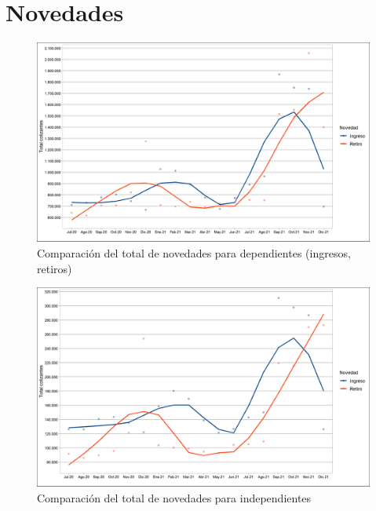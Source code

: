 \section{Novedades}


\begin{figure}
\label{fig:Cap22:Novedad_1}%
\includegraphics[width = 11.5cm]{figures/Capitulo_2_2/total_novedades_dependientes_1.png}
\caption{Comparación del total de novedades para dependientes (ingresos, retiros)}
\label{figura:novedad:sectorprivado:IR}
\end{figure}

\lipsum[2-4]

\begin{figure}
\label{fig:Cap22:Novedad_2}
\includegraphics[width = 11.5cm]{figures/Capitulo_2_2/total_novedades_independientes_1.png}
\caption{Comparación del total de novedades para independientes}
\label{figura:novedad:sectorprivado:IR}
\end{figure}

\lipsum[2-5]

